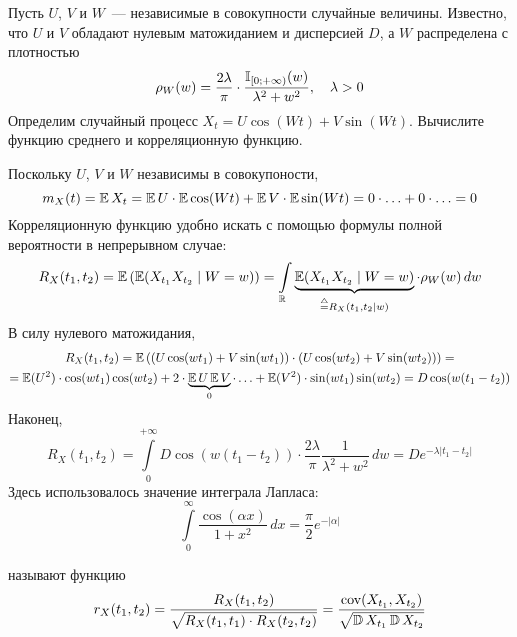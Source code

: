 \begin{Exercise}[counter=SecExercise, label={exercise:basics:cos_and_sin}]
    \noindent
    Пусть $ U $, $ V $ и $ W $~--- независимые в совокупности случайные величины.
    Известно, что $ U $ и $ V $ обладают нулевым матожиданием и дисперсией $ D $,
    а $ W $ распределена с плотностью
    \[
        \rho_W(w) = \frac{2 \lambda}{\pi} \cdot \frac{\mathbb{I}_{[0; +\infty)}(w)}{\lambda^2 + w^2}, \quad \lambda > 0
    \]
    Определим случайный процесс $ X_t = U \cos(W t) + V \sin(W t) $.
    Вычислите функцию среднего и корреляционную функцию.
\end{Exercise}

\begin{Answer}
    \noindent
    Поскольку $ U $, $ V $ и $ W $ независимы в совокупоности,
    \[
        m_X(t) = \operatorname{\mathbb{E}} X_t = \operatorname{\mathbb{E}} U \cdot \operatorname{\mathbb{E}} \cos(W t) + \operatorname{\mathbb{E}} V \cdot \operatorname{\mathbb{E}} \sin(W t) = 0 \cdot \ldots + 0 \cdot \ldots = 0
    \]
    Корреляционную функцию удобно искать с помощью формулы полной вероятности в непрерывном случае:
    \[
        R_X(t_1, t_2) = \operatorname{\mathbb{E}} \left( \operatorname{\mathbb{E}}(X_{t_1} X_{t_2} \mid W = w) \right) = \int\limits_{\mathbb{R}} \underbrace{\operatorname{\mathbb{E}}(X_{t_1} X_{t_2} \mid W = w)}_{\overset{\triangle}{=} R_X(t_1, t_2 \mid w)} \cdot \rho_W(w) \, dw
    \]
    В силу нулевого матожидания,
    \begin{multline*}
        R_X(t_1, t_2) = \operatorname{\mathbb{E}} \left( (U \cos(w t_1) + V \sin(w t_1)) \cdot (U \cos(w t_2) + V \sin(w t_2)) \right) = \\
        = \operatorname{\mathbb{E}} (U^2) \cdot \cos(w t_1) \cos(w t_2) + 2 \cdot \underbrace{\operatorname{\mathbb{E}} U \operatorname{\mathbb{E}} V}_{0} \cdot \ldots + \operatorname{\mathbb{E}} (V^2) \cdot \sin(w t_1) \sin(w t_2) = D \cos(w(t_1 - t_2))
    \end{multline*}
    Наконец,
    \[
        R_X(t_1, t_2) = \int\limits_0^{+\infty} D \cos(w(t_1 - t_2)) \cdot \frac{2 \lambda}{\pi} \frac{1}{\lambda^2 + w^2} \, dw = D e^{-\lambda |t_1 - t_2|}
    \]
    Здесь использовалось значение интеграла Лапласа:
    \[
        \int\limits_0^\infty \frac{\cos(\alpha x)}{1 + x^2} \, dx = \frac{\pi}{2} e^{-|\alpha|}
    \]
\end{Answer}


\begin{definition}
    \label{definition:basics:correlation_coefficient_function}
     называют функцию
    \[
        r_X(t_1, t_2) = \frac{R_X(t_1, t_2)}{\sqrt{R_X(t_1, t_1) \cdot R_X(t_2, t_2)}} = \frac{\textnormal{cov}(X_{t_1}, X_{t_2})}{\sqrt{\operatorname{\mathbb{D}} X_{t_1} \operatorname{\mathbb{D}} X_{t_2}}}
    \]
\end{definition}

